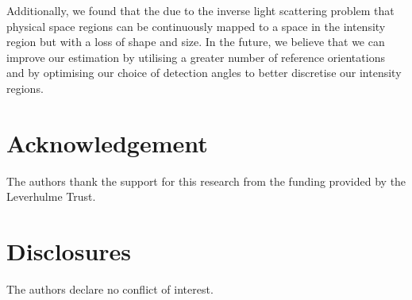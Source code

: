 \documentclass[final,  3p]{elsarticle}
\begin{document}
Additionally, we found that the due to the inverse light scattering
problem that physical space regions can be continuously mapped to a
space in the intensity region but with a loss of shape and size.  In
the future, we believe that we can improve our estimation by utilising
a greater number of reference orientations and by optimising our
choice of detection angles to better discretise our intensity regions.


\section*{Acknowledgement}

The authors thank the support for this research from the funding
provided by the Leverhulme Trust.


\section*{Disclosures}

The authors declare no conflict of interest. 


 


\newpage
\appendix
\onecolumn
\end{document}
